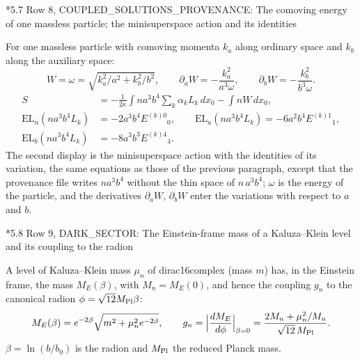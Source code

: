 \documentclass[10pt,a4paper]{article}
\makeatletter
\renewcommand\subsection{\@startsection{subsection}{2}{\z@}{-3.25ex\@plus -1ex \@minus -.2ex}{1.5ex \@plus .2ex}{\normalfont\large\bfseries\raggedright}}
\makeatother
\begin{document}
\subsection*{5.7 Row 8, COUPLED\_SOLUTIONS\_PROVENANCE: The comoving energy of one massless particle; the minisuperspace action and its identities}
For one massless particle with comoving momenta $k_a$ along ordinary space and $k_b$ along the auxiliary space:
\begin{equation*}
W=\omega=\sqrt{k_a^2/a^2+k_b^2/b^2},\qquad \partial_aW=-\frac{k_a^2}{a^3\omega},\qquad \partial_bW=-\frac{k_b^2}{b^3\omega} .
\end{equation*}
\begin{align*}
S&=-\frac1{2\kappa}\int na^3b^4\sum_k\alpha_kL_k\,dx_0-\int nW\,dx_0, \\
\mathrm{EL}_n(na^3b^4L_k)&=-2a^3b^4E^{(k)0}{}_0,\qquad \mathrm{EL}_a(na^3b^4L_k)=-6a^2b^4E^{(k)1}{}_1, \\
\mathrm{EL}_b(na^3b^4L_k)&=-8a^3b^3E^{(k)4}{}_4 .
\end{align*}
The second display is the minisuperspace action with the identities of its variation, the same equations as those of the previous paragraph, except that the provenance file writes $na^3b^4$ without the thin space of $n\,a^3b^4$; $\omega$ is the energy of the particle, and the derivatives $\partial_aW$, $\partial_bW$ enter the variations with respect to $a$ and $b$.

\subsection*{5.8 Row 9, DARK\_SECTOR: The Einstein-frame mass of a Kaluza–Klein level and its coupling to the radion}
A level of Kaluza–Klein mass $\mu_n$ of dirac16complex (mass $m$) has, in the Einstein frame, the mass $M_E(\beta)$, with $M_n=M_E(0)$, and hence the coupling $g_n$ to the canonical radion $\phi=\sqrt{12}M_{\rm Pl}\beta$:
\begin{equation*}
M_E(\beta)=e^{-2\beta}\sqrt{m^2+\mu_n^2e^{-2\beta}},\qquad g_n=\Big|\frac{dM_E}{d\phi}\Big|_{\beta=0}=\frac{2M_n+\mu_n^2/M_n}{\sqrt{12}\,M_{\rm Pl}} .
\end{equation*}
$\beta=\ln(b/b_0)$ is the radion and $M_{\rm Pl}$ the reduced Planck mass.
\end{document}
